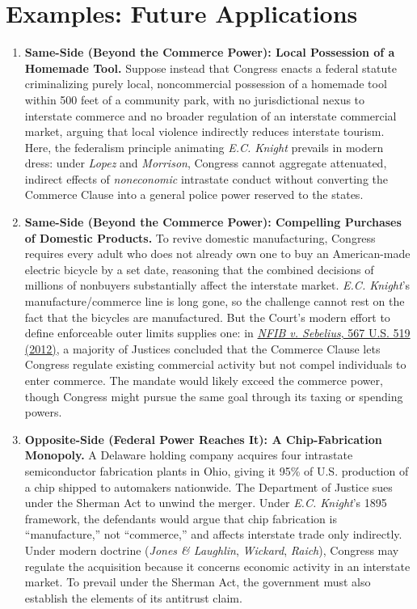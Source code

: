 \documentclass[12pt]{article}
\begin{document}
\section{Examples: Future Applications}
\begin{enumerate}

\item \textbf{Same-Side (Beyond the Commerce Power): Local Possession of a Homemade Tool.} Suppose instead that Congress enacts a federal statute criminalizing purely local, noncommercial possession of a homemade tool within 500 feet of a community park, with no jurisdictional nexus to interstate commerce and no broader regulation of an interstate commercial market, arguing that local violence indirectly reduces interstate tourism. Here, the federalism principle animating \textit{E.C. Knight} prevails in modern dress: under \textit{Lopez} and \textit{Morrison}, Congress cannot aggregate attenuated, indirect effects of \textit{noneconomic} intrastate conduct without converting the Commerce Clause into a general police power reserved to the states.

\item \textbf{Same-Side (Beyond the Commerce Power): Compelling Purchases of Domestic Products.} To revive domestic manufacturing, Congress requires every adult who does not already own one to buy an American-made electric bicycle by a set date, reasoning that the combined decisions of millions of nonbuyers substantially affect the interstate market. \textit{E.C. Knight}'s manufacture/commerce line is long gone, so the challenge cannot rest on the fact that the bicycles are manufactured. But the Court's modern effort to define enforceable outer limits supplies one: in \href{https://supreme.justia.com/cases/federal/us/567/519/}{\textit{NFIB v. Sebelius}, 567 U.S. 519 (2012)}, a majority of Justices concluded that the Commerce Clause lets Congress regulate existing commercial activity but not compel individuals to enter commerce. The mandate would likely exceed the commerce power, though Congress might pursue the same goal through its taxing or spending powers.

\item \textbf{Opposite-Side (Federal Power Reaches It): A Chip-Fabrication Monopoly.} A Delaware holding company acquires four intrastate semiconductor fabrication plants in Ohio, giving it 95\% of U.S. production of a chip shipped to automakers nationwide. The Department of Justice sues under the Sherman Act to unwind the merger. Under \textit{E.C. Knight}'s 1895 framework, the defendants would argue that chip fabrication is ``manufacture,'' not ``commerce,'' and affects interstate trade only indirectly. Under modern doctrine (\textit{Jones \& Laughlin}, \textit{Wickard}, \textit{Raich}), Congress may regulate the acquisition because it concerns economic activity in an interstate market. To prevail under the Sherman Act, the government must also establish the elements of its antitrust claim.


\end{enumerate}
\end{document}
